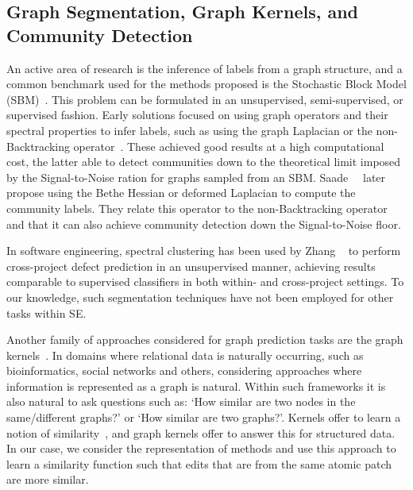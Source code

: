 \subsection{Graph Segmentation, Graph Kernels, and Community Detection}
\label{chapter:literature:sec:flexeme_rel_work:graph_seg}


An active area of research is the inference of labels from a graph structure,
and a common benchmark used for the methods proposed is the Stochastic Block
Model (SBM)~\cite{HOLLAND1983}. This problem can be formulated in an
unsupervised, semi-supervised, or supervised fashion. Early solutions focused on
using graph operators and their spectral properties to infer labels, such as
using the graph Laplacian or the non-Backtracking operator~\cite{Krzakala2013}.
These achieved good results at a high computational cost, the latter able to
detect communities down to the theoretical limit imposed by the Signal-to-Noise
ration for graphs sampled from an SBM. Saade~\etal~\cite{Saade2014} later
propose using the Bethe Hessian or deformed Laplacian to compute the community
labels. They relate this operator to the non-Backtracking operator and that it
can also achieve community detection down the Signal-to-Noise floor.

In software engineering, spectral clustering has been used by Zhang
\etal~\cite{Zhang2016} to perform cross-project defect prediction in an
unsupervised manner, achieving results comparable to supervised classifiers in
both within- and cross-project settings. To our knowledge, such segmentation
techniques have not been employed for other tasks within SE.

Another family of approaches considered for graph prediction tasks are the graph
kernels~\cite{vishwanathan2010graph}. In domains where relational data is
naturally occurring, such as bioinformatics, social networks and others,
considering approaches where information is represented as a graph is natural.
Within such frameworks it is also natural to ask questions such as: `How similar
are two nodes in the same/different graphs?' or `How similar are two graphs?'.
Kernels offer to learn a notion of similarity~\cite{smola1998learning}, and
graph kernels offer to answer this for structured data. In our case, we consider
the \deltaPDGN representation of methods and use this approach to learn a
similarity function such that edits that are from the same atomic patch are more
similar.

